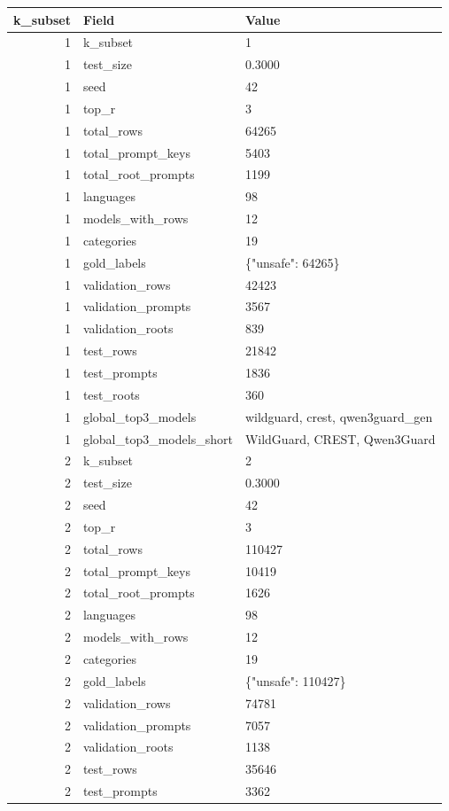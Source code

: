 \begin{tabular}{rll}
\toprule
k\_subset & Field & Value \\
\midrule
1 & k\_subset & 1 \\
1 & test\_size & 0.3000 \\
1 & seed & 42 \\
1 & top\_r & 3 \\
1 & total\_rows & 64265 \\
1 & total\_prompt\_keys & 5403 \\
1 & total\_root\_prompts & 1199 \\
1 & languages & 98 \\
1 & models\_with\_rows & 12 \\
1 & categories & 19 \\
1 & gold\_labels & \{"unsafe": 64265\} \\
1 & validation\_rows & 42423 \\
1 & validation\_prompts & 3567 \\
1 & validation\_roots & 839 \\
1 & test\_rows & 21842 \\
1 & test\_prompts & 1836 \\
1 & test\_roots & 360 \\
1 & global\_top3\_models & wildguard, crest, qwen3guard\_gen \\
1 & global\_top3\_models\_short & WildGuard, CREST, Qwen3Guard \\
2 & k\_subset & 2 \\
2 & test\_size & 0.3000 \\
2 & seed & 42 \\
2 & top\_r & 3 \\
2 & total\_rows & 110427 \\
2 & total\_prompt\_keys & 10419 \\
2 & total\_root\_prompts & 1626 \\
2 & languages & 98 \\
2 & models\_with\_rows & 12 \\
2 & categories & 19 \\
2 & gold\_labels & \{"unsafe": 110427\} \\
2 & validation\_rows & 74781 \\
2 & validation\_prompts & 7057 \\
2 & validation\_roots & 1138 \\
2 & test\_rows & 35646 \\
2 & test\_prompts & 3362 \\

\end{tabular}
